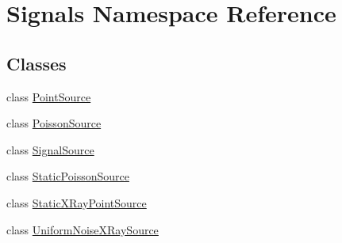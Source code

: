 \hypertarget{namespaceSignals}{}\section{Signals Namespace Reference}
\label{namespaceSignals}
\subsection*{Classes}
\begin{DoxyCompactItemize}
\item 
class \hyperlink{classSignals_1_1PointSource}{Point\+Source}
\item 
class \hyperlink{classSignals_1_1PoissonSource}{Poisson\+Source}
\item 
class \hyperlink{classSignals_1_1SignalSource}{Signal\+Source}
\item 
class \hyperlink{classSignals_1_1StaticPoissonSource}{Static\+Poisson\+Source}
\item 
class \hyperlink{classSignals_1_1StaticXRayPointSource}{Static\+X\+Ray\+Point\+Source}
\item 
class \hyperlink{classSignals_1_1UniformNoiseXRaySource}{Uniform\+Noise\+X\+Ray\+Source}
\end{DoxyCompactItemize}
